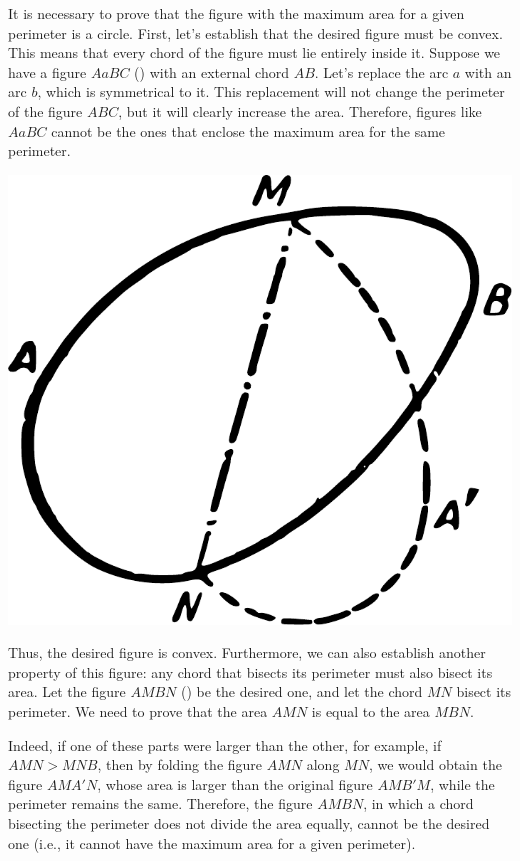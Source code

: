 It is necessary to prove that the figure with the maximum area for a given perimeter is a circle. First, let's establish that the desired figure must be convex. This means that every chord of the figure must lie entirely inside it. Suppose we have a figure \(AaBC\) () with an external chord \(AB\). Let's replace the arc \(a \) with an arc \(b \), which is symmetrical to it. This replacement will not change the perimeter of the figure \(ABC\), but it will clearly increase the area. Therefore, figures like \(AaBC\) cannot be the ones that enclose the maximum area for the same perimeter.

\begin{marginfigure}[-2cm]%
\centering
\includegraphics[width=\textwidth]{figures/ch-12/fig-178.pdf}
\end{marginfigure}

Thus, the desired figure is convex. Furthermore, we can also establish another property of this figure: any chord that bisects its perimeter must also bisect its area. Let the figure \(AMBN\) () be the desired one, and let the chord \(MN\) bisect its perimeter. We need to prove that the area \(AMN\) is equal to the area \(MBN\). 



Indeed, if one of these parts were larger than the other, for example, if \(AMN > MNB\), then by folding the figure \(AMN\) along \(MN\), we would obtain the figure \(AMA'N\), whose area is larger than the original figure \(AMB'M\), while the perimeter remains the same. Therefore, the figure \(AMBN\), in which a chord bisecting the perimeter does not divide the area equally, cannot be the desired one (i.e., it cannot have the maximum area for a given perimeter).

